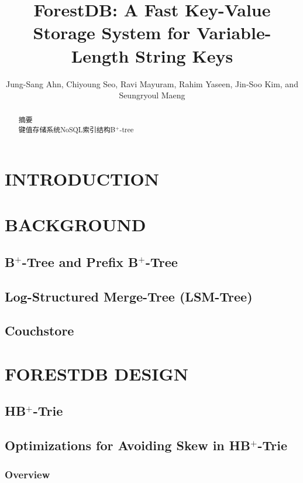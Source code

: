 \documentclass[lang=cn]{elegantpaper}
\title{ForestDB: A Fast Key-Value Storage System for Variable-Length String Keys}
\author{Jung-Sang Ahn, Chiyoung Seo, Ravi Mayuram, Rahim Yaseen, Jin-Soo Kim, and Seungryoul Maeng}
\begin{document}
\maketitle

\begin{abstract}
\noindent \sffamily 摘要\\

\noindent {} 键值存储系统\quad NoSQL\quad 索引结构\quad B$^+$-tree
\end{abstract}

\section{INTRODUCTION}

\newpage

\section{BACKGROUND}
      
\subsection{B$^+$-Tree and Prefix B$^+$-Tree}

\subsection{Log-Structured Merge-Tree (LSM-Tree)}

\subsection{Couchstore}

\newpage

\section{FORESTDB DESIGN}

\subsection{HB$^+$-Trie}

\subsection{Optimizations for Avoiding Skew in HB$^+$-Trie}

\subsubsection{Overview}
\end{document}
